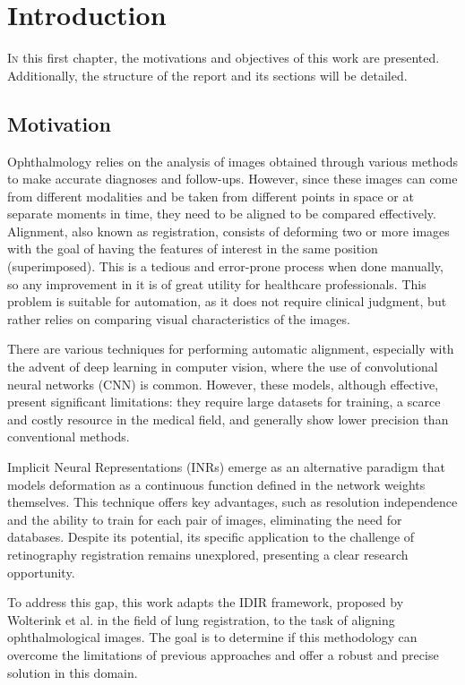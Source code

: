\chapter{Introduction}
\label{chap:introducion}

\lettrine{I} n this first chapter, the motivations and objectives of this work are presented. Additionally, the structure of the report and its sections will be detailed.

\section{Motivation}
\label{sec:motivacion}

Ophthalmology relies on the analysis of images obtained through various methods to make accurate diagnoses and follow-ups. However, since these images can come from different modalities and be taken from different points in space or at separate moments in time, they need to be aligned to be compared effectively. Alignment, also known as registration, consists of deforming two or more images with the goal of having the features of interest in the same position (superimposed). This is a tedious and error-prone process when done manually, so any improvement in it is of great utility for healthcare professionals. This problem is suitable for automation, as it does not require clinical judgment, but rather relies on comparing visual characteristics of the images.

There are various techniques for performing automatic alignment, especially with the advent of deep learning in computer vision, where the use of convolutional neural networks (CNN) is common. However, these models, although effective, present significant limitations: they require large datasets for training, a scarce and costly resource in the medical field, and generally show lower precision than conventional methods.

Implicit Neural Representations (INRs) emerge as an alternative paradigm that models deformation as a continuous function defined in the network weights themselves. This technique offers key advantages, such as resolution independence and the ability to train for each pair of images, eliminating the need for databases. Despite its potential, its specific application to the challenge of retinography registration remains unexplored, presenting a clear research opportunity.

To address this gap, this work adapts the IDIR framework, proposed by Wolterink et al. \cite{wolterink2021implicit} in the field of lung registration, to the task of aligning ophthalmological images. The goal is to determine if this methodology can overcome the limitations of previous approaches and offer a robust and precise solution in this domain.

